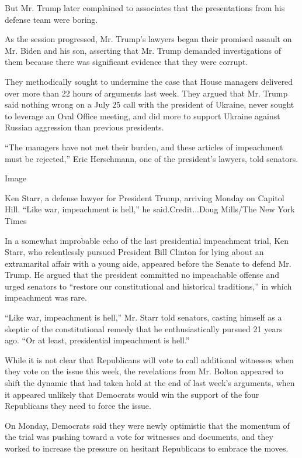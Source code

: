 But Mr. Trump later complained to associates that the presentations from
his defense team were boring.

As the session progressed, Mr. Trump's lawyers began their promised
assault on Mr. Biden and his son, asserting that Mr. Trump demanded
investigations of them because there was significant evidence that they
were corrupt.

They methodically sought to undermine the case that House managers
delivered over more than 22 hours of arguments last week. They argued
that Mr. Trump said nothing wrong on a July 25 call with the president
of Ukraine, never sought to leverage an Oval Office meeting, and did
more to support Ukraine against Russian aggression than previous
presidents.

``The managers have not met their burden, and these articles of
impeachment must be rejected,'' Eric Herschmann, one of the president's
lawyers, told senators.

Image

Ken Starr, a defense lawyer for President Trump, arriving Monday on
Capitol Hill. ``Like war, impeachment is hell,'' he said.Credit...Doug
Mills/The New York Times

In a somewhat improbable echo of the last presidential impeachment
trial, Ken Starr, who relentlessly pursued President Bill Clinton for
lying about an extramarital affair with a young aide, appeared before
the Senate to defend Mr. Trump. He argued that the president committed
no impeachable offense and urged senators to ``restore our
constitutional and historical traditions,'' in which impeachment was
rare.

``Like war, impeachment is hell,'' Mr. Starr told senators, casting
himself as a skeptic of the constitutional remedy that he
enthusiastically pursued 21 years ago. ``Or at least, presidential
impeachment is hell.''

While it is not clear that Republicans will vote to call additional
witnesses when they vote on the issue this week, the revelations from
Mr. Bolton appeared to shift the dynamic that had taken hold at the end
of last week's arguments, when it appeared unlikely that Democrats would
win the support of the four Republicans they need to force the issue.

On Monday, Democrats said they were newly optimistic that the momentum
of the trial was pushing toward a vote for witnesses and documents, and
they worked to increase the pressure on hesitant Republicans to embrace
the moves.

